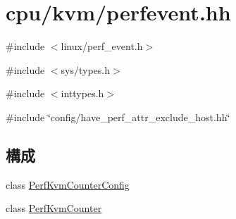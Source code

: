 \hypertarget{perfevent_8hh}{
\section{cpu/kvm/perfevent.hh}
\label{perfevent_8hh}
}
{\ttfamily \#include $<$linux/perf\_\-event.h$>$}\par
{\ttfamily \#include $<$sys/types.h$>$}\par
{\ttfamily \#include $<$inttypes.h$>$}\par
{\ttfamily \#include \char`\"{}config/have\_\-perf\_\-attr\_\-exclude\_\-host.hh\char`\"{}}\par
\subsection*{構成}
\begin{DoxyCompactItemize}
\item 
class \hyperlink{classPerfKvmCounterConfig}{PerfKvmCounterConfig}
\item 
class \hyperlink{classPerfKvmCounter}{PerfKvmCounter}
\end{DoxyCompactItemize}
